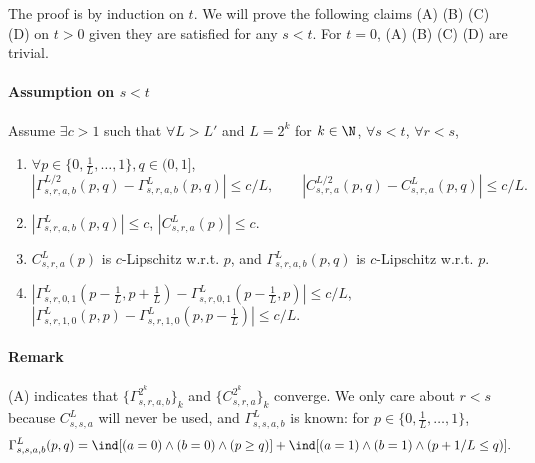 The proof is by induction on $t$. We will prove the following claims (A) (B) (C) (D) on $t > 0$ given they are satisfied for any $s<t$. For $t=0$, (A) (B) (C) (D) are trivial. 
\paragraph{Assumption on $s<t$} Assume $\exists c>1$ such that $\forall L > L'$ and $L=2^k$ for $k\in \N$, $\forall s < t$, $\forall r < s$,
\begin{enumerate}[label=(\Alph*)]
    \item $\forall p \in \{0, \frac1L, \ldots, 1\}, q\in (0,1]$,
    \[|\Gamma^{L/2}_{s,r,a,b}(p,q) - \Gamma^L_{s,r,a,b}(p,q)| \leq c/L,\qquad |C^{L/2}_{s,r,a}(p,q) - C^{L}_{s,r,a}(p,q)|\leq c / L.\]
    \item $|\Gamma^{L}_{s,r,a,b}(p,q)|\leq c$, $|C^L_{s,r,a}(p)|\leq c$.
    \item $C^L_{s, r, a}(p)$ is $c$-Lipschitz w.r.t. $p$, and $\Gamma^L_{s,r,a,b}(p,q)$ is $c$-Lipschitz w.r.t. $p$. 
    \item $|\Gamma^L_{s,r,0,1}(p-\frac1L,p+\frac1L)-\Gamma^L_{s,r,0,1}(p-\frac1L,p)|\leq c/L$,
    $|\Gamma^L_{s,r,1,0}(p,p) - \Gamma^L_{s,r,1,0}(p,p-\frac1L)|\leq c/L$.
\end{enumerate}

\paragraph{Remark}
    (A) indicates that $\{\Gamma^{2^k}_{s,r,a,b}\}_k$ and $\{C^{2^k}_{s,r,a}\}_k$ converge.
    We only care about $r<s$ because $C^L_{s,s,a}$ will never be used, and $\Gamma^L_{s,s,a,b}$ is known: for $p\in \{0, \frac1L, \ldots, 1\}$, \[\Gamma^L_{s,s,a,b}(p,q) = \ind[(a=0)\wedge (b=0)\wedge (p\geq q)]+ \ind[(a=1)\wedge (b=1)\wedge (p+1/L\leq q)].\]
    

    

